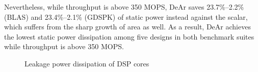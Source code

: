 {    Nevertheless, while throughput is above 350 MOPS, DeAr saves 23.7\%--2.2\% (BLAS) and 23.4\%--2.1\% (GDSPK) of static power instead against the scalar, 
    which suffers from the sharp growth of area as well.
    As a result, DeAr achieves the lowest static power dissipation among five designs in both benchmark suites while throughput is above 350 MOPS.
    \vspace{\textfig}
    \begin{figure}[!ht]
        \begin{center}
        \end{center}
        \caption{Leakage power dissipation of DSP cores}
        \label{chart:leakage}
    \end{figure}
}


